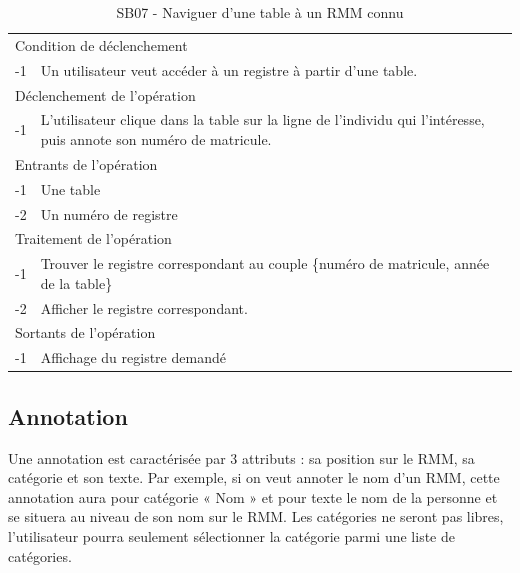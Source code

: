 \documentclass[a4paper]{article}
\begin{document}
\begin{table}[H]
  \centering
   \small
  \begin{tabular}{|c|p{12cm}|}
      \hline
        \rowcolor{lightgray}\multicolumn{2}{|c|}{\textbf{SB07 - Naviguer d'une table à un RMM connu}} \\
      \hline
        \multicolumn{2}{|l|}{Condition de d\'eclenchement} \\
      \hline
      -1 & Un utilisateur veut acc\'eder \`a un registre à partir d'une table. \\
      \hline
        \multicolumn{2}{|l|}{D\'eclenchement de l'op\'eration} \\
      \hline
        -1 & L'utilisateur clique dans la table sur la ligne de l'individu qui l'intéresse, puis annote son numéro de matricule. \\
      \hline
        \multicolumn{2}{|l|}{Entrants de l'op\'eration} \\
      \hline
        -1 & Une table \\
          -2 & Un numéro de registre \\ 
      \hline
        \multicolumn{2}{|l|}{Traitement de l'op\'eration} \\
      \hline
        -1 & Trouver le registre correspondant au couple \{numéro de matricule, année de la table\} \\
          -2 & Afficher le registre correspondant. \\
      \hline
        \multicolumn{2}{|l|}{Sortants de l'op\'eration} \\
      \hline
        -1 & Affichage du registre demand\'e \\
      \hline
  \end{tabular}
  \caption{SB07 - Naviguer d'une table à un RMM connu}
  \normalsize
  \label{tab:naviguer_table_registre_connu}
\end{table}


\subsection{Annotation}

	Une annotation est caractérisée par 3 attributs : sa position sur le RMM, sa catégorie et son texte. Par exemple, si on veut annoter le nom d’un RMM, cette annotation aura pour catégorie « Nom » et pour texte le nom de la personne et se situera au niveau de son nom sur le RMM. Les catégories ne seront pas libres, l’utilisateur pourra seulement sélectionner la catégorie parmi une liste de catégories.
\end{document}
